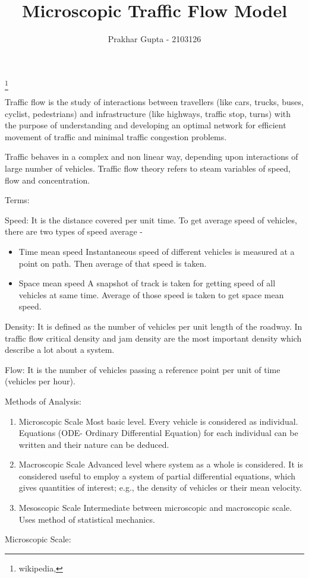 \documentclass[12pt, letterpaper]{article}
\begin{document}
\title{Microscopic Traffic Flow Model}
\author{Prakhar Gupta - 2103126}
\thanks{wikipedia, }
\maketitle
Traffic flow is the study of interactions between travellers (like cars, trucks, buses, cyclist, pedestrians) and infrastructure (like highways, traffic stop, turns) with the purpose of understanding and developing an optimal network for efficient movement of traffic and minimal traffic congestion problems.

Traffic behaves in a complex and non linear way, depending upon interactions of large number of vehicles. Traffic flow theory refers to steam variables of speed, flow and concentration.

Terms:

Speed: It is the distance covered per unit time.
To get average speed of vehicles, there are two types of speed average - \begin{itemize}
\item Time mean speed 
	 Instantaneous speed of different vehicles is measured at a point on path. Then average of that speed is taken.
\item Space mean speed
	A snapshot of track is taken for getting speed of all vehicles at same time. Average of those speed is taken to get space mean speed.
\end{itemize}

Density: It is defined as the number of vehicles per unit length of the roadway. In traffic flow critical density and jam density are the most important density which describe a lot about a system.

Flow: It is the number of vehicles passing a reference point per unit of time (vehicles per hour). 

Methods of Analysis:
\begin{enumerate}
\item Microscopic Scale
Most basic level. Every vehicle is considered as individual. Equations (ODE- Ordinary Differential Equation) for each individual can be written and their nature can be deduced.
\item Macroscopic Scale
Advanced level where system as a whole is considered. It is considered useful to employ a system of partial differential equations, which gives quantities of interest; e.g., the density of vehicles or their mean velocity.
\item Mesoscopic Scale 
Intermediate between microscopic and macroscopic scale. Uses method of statistical mechanics.
\end{enumerate}
Microscopic Scale: 
\end{document}
